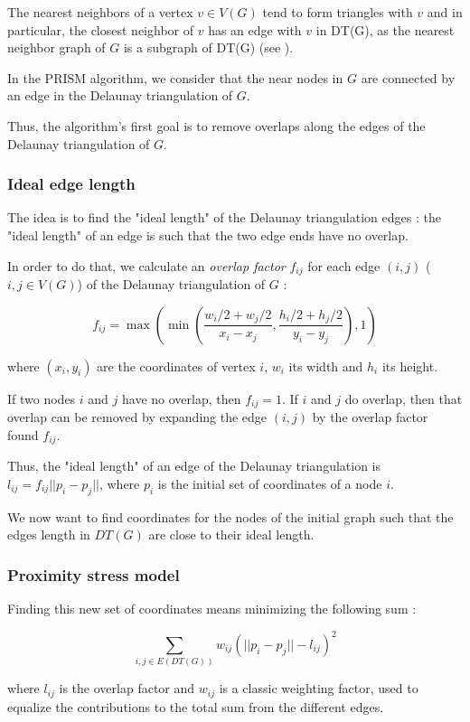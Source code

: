 \documentclass[12pt]{report}
\begin{document}
\bigskip

The nearest neighbors of a vertex $v \in V(G)$ tend to form triangles with $v$ and in particular, the closest neighbor of $v$ has an edge with $v$ in DT(G), as the nearest neighbor graph of $G$ is a subgraph of DT(G) (see \cite{JT92}).

In the PRISM algorithm, we consider that the near nodes in $G$ are connected by an edge in the Delaunay triangulation of $G$.

Thus, the algorithm's first goal is to remove overlaps along the edges of the Delaunay triangulation of $G$.

\subsubsection{Ideal edge length}
The idea is to find the "ideal length" of the Delaunay triangulation edges : the "ideal length" of an edge is such that the two edge ends have no overlap.

\bigskip
In order to do that, we calculate an \emph{overlap factor} $f_{ij}$ for each edge $(i,j)$ ($i,j \in V(G)$) of the Delaunay triangulation of $G$ :

\[ f_{ij} = \max ( \min (\frac{w_i/2 + w_j/2}{x_i - x_j}, 
\frac{h_i/2 + h_j/2}{y_i - y_j}), 1)\]

where $(x_i,y_i)$ are the coordinates of vertex $i$, $w_i$ its width and $h_i$ its height.

If two nodes $i$ and $j$ have no overlap, then $f_{ij} = 1$. 
If $i$ and $j$ do overlap, then that overlap can be removed by expanding the edge $(i,j)$ by the overlap factor found $f_{ij}$. %

\bigskip
Thus, the "ideal length" of an edge of the Delaunay triangulation is $l_{ij} = f_{ij}||p_i - p_j||$, where $p_i$ is the initial set of coordinates of a node $i$.

We now want to find coordinates for the nodes of the initial graph such that the edges length in $DT(G)$ are close to their ideal length.

\subsubsection{Proximity stress model}

Finding this new set of coordinates means minimizing the following sum :

\[ \sum_{i,j \in E(DT(G))} w_{ij}(||p_i - p_j|| - l_{ij})^2\]

where $l_{ij}$ is the overlap factor and $w_{ij}$ is a classic weighting factor, used to equalize the contributions to the total sum from the different edges.
\end{document}
